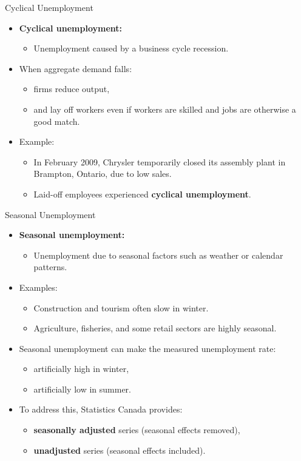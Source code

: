 \documentclass[aspectratio=169]{beamer}
\begin{document}
\begin{frame}{Cyclical Unemployment}
\transfade
\begin{itemize}
  \item \textbf{Cyclical unemployment:}
  \begin{itemize}
    \item Unemployment caused by a \alert{business cycle recession}.
  \end{itemize}
  \item When aggregate demand falls:
  \begin{itemize}
    \item firms reduce output,
    \item and lay off workers even if workers are skilled and jobs are otherwise a good match.
  \end{itemize}
  \item Example:
  \begin{itemize}
    \item In February 2009, Chrysler temporarily closed its assembly plant in Brampton, Ontario, due to low sales.
    \item Laid-off employees experienced \textbf{cyclical unemployment}.
  \end{itemize}
\end{itemize}
\end{frame}

\begin{frame}{Seasonal Unemployment}
\transfade
\begin{itemize}
  \item \textbf{Seasonal unemployment:}
  \begin{itemize}
    \item Unemployment due to seasonal factors such as weather or calendar patterns.
  \end{itemize}
  \item Examples:
  \begin{itemize}
    \item Construction and tourism often slow in winter.
    \item Agriculture, fisheries, and some retail sectors are highly seasonal.
  \end{itemize}
  \item Seasonal unemployment can make the measured unemployment rate:
  \begin{itemize}
    \item artificially high in winter,
    \item artificially low in summer.
  \end{itemize}
  \item To address this, Statistics Canada provides:
  \begin{itemize}
    \item \textbf{seasonally adjusted} series (seasonal effects removed),
    \item \textbf{unadjusted} series (seasonal effects included).
  \end{itemize}
\end{itemize}
\end{frame}
\end{document}
